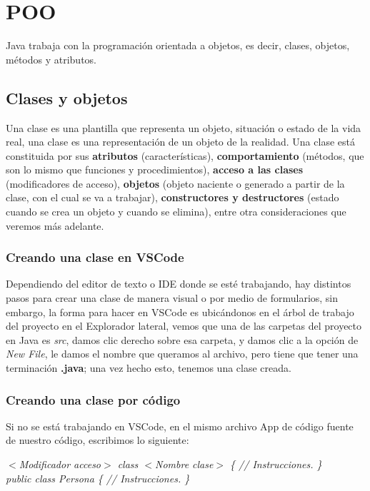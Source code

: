 \section{POO}
\hspace{0.55cm}Java trabaja con la programación orientada a objetos, es decir, clases, objetos, métodos y atributos.


\subsection{Clases y objetos}
\hspace{0.55cm}Una clase es una plantilla que representa un objeto, situación o estado de la vida real, una clase es una representación de un objeto de la realidad. Una clase está constituida por sus \textbf{atributos} (características), \textbf{comportamiento} (métodos, que son lo mismo que funciones y procedimientos), \textbf{acceso a las clases} (modificadores de acceso), \textbf{objetos} (objeto naciente o generado a partir de la clase, con el cual se va a trabajar), \textbf{constructores y destructores} (estado cuando se crea un objeto y cuando se elimina), entre otra consideraciones que veremos más adelante.


\subsubsection{Creando una clase en VSCode}
\hspace{0.55cm}Dependiendo del editor de texto o IDE donde se esté trabajando, hay distintos pasos para crear una clase de manera visual o por medio de formularios, sin embargo, la forma para hacer en VSCode es ubicándonos en el árbol de trabajo del proyecto en el Explorador lateral, vemos que una de las carpetas del proyecto en Java es \textit{src}, damos clic derecho sobre esa carpeta, y damos clic a la opción de \textit{New File}, le damos el nombre que queramos al archivo, pero tiene que tener una terminación \textbf{.java}; una vez hecho esto, tenemos una clase creada.


\subsubsection{Creando una clase por código}
\hspace{0.55cm}Si no se está trabajando en VSCode, en el mismo archivo App de código fuente de nuestro código, escribimos lo siguiente:
\begin{center}
    \textit{
        $<$Modificador acceso$>$ class $<$Nombre clase$>$ \{ // Instrucciones. \} \\
        public class Persona \{ // Instrucciones. \}
    }
\end{center}

